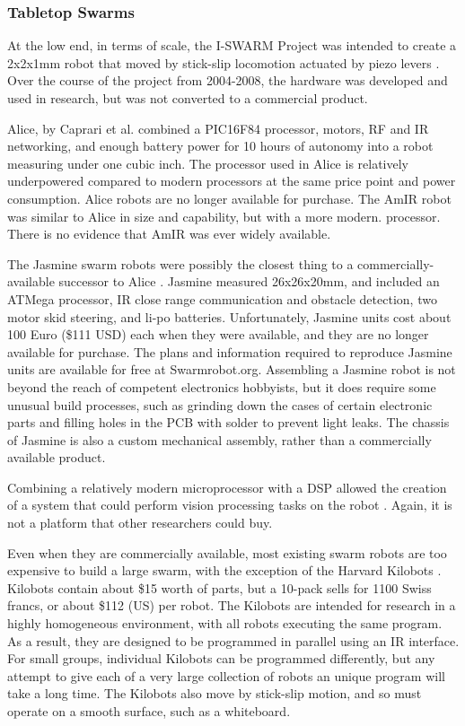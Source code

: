 \documentclass[]{article}
\begin{document}
\subsubsection{Tabletop Swarms}

At the low end, in terms of scale, the I-SWARM Project was intended to create a 2x2x1mm robot that moved by stick-slip locomotion actuated by piezo levers \cite{seyfried2005swarm}. 
Over the course of the project from 2004-2008, the hardware was developed and used in research, but was not converted to a commercial product. 

Alice, by Caprari et al. \cite{caprari1998autonomous} combined a PIC16F84 processor, motors, RF and IR networking, and enough battery power for 10 hours of autonomy into a robot measuring under one cubic inch. 
The processor used in Alice is relatively underpowered compared to modern processors at the same price point and power consumption. 
Alice robots are no longer available for purchase. 
The AmIR robot was similar to Alice in size and capability, but with a more modern. processor\cite{arvin2009development}.
There is no evidence that AmIR was ever widely available.

The Jasmine swarm robots were possibly the closest thing to a commercially-available successor to Alice  \cite{kernbach2011swarmrobot}.
Jasmine measured 26x26x20mm, and included an ATMega processor, IR close range communication and obstacle detection, two motor skid steering, and li-po batteries.
Unfortunately, Jasmine units cost about 100 Euro (\$111 USD) each when they were available, and they are no longer available for purchase. 
The plans and information required to reproduce Jasmine units are available for free at Swarmrobot.org.
Assembling a Jasmine robot is not beyond the reach of competent electronics hobbyists, but it does require some unusual build processes, such as grinding down the cases of certain electronic parts and filling holes in the PCB with solder to prevent light leaks. 
The chassis of Jasmine is also a custom mechanical assembly, rather than a commercially available product. 

Combining a relatively modern microprocessor with a DSP allowed the creation of a system that could perform vision processing tasks on the robot \cite{haverinen2005miniature}. 
Again, it is not a platform that other researchers could buy.

Even when they are commercially available, most existing swarm robots are too expensive to build a large swarm, with the exception of the Harvard Kilobots  \cite{rubenstein2014kilobot}. 
Kilobots contain about \$15 worth of parts, but a 10-pack sells for 1100 Swiss francs, or about \$112 (US) per robot. 
The Kilobots are intended for research in a highly homogeneous environment, with all robots executing the same program. 
As a result, they are designed to be programmed in parallel using an IR interface. 
For small groups, individual Kilobots can be programmed differently, but any attempt to give each of a very large collection of robots an unique program will take a long time. 
The Kilobots also move by stick-slip motion, and so must operate on a smooth surface, such as a whiteboard. 
\end{document}
